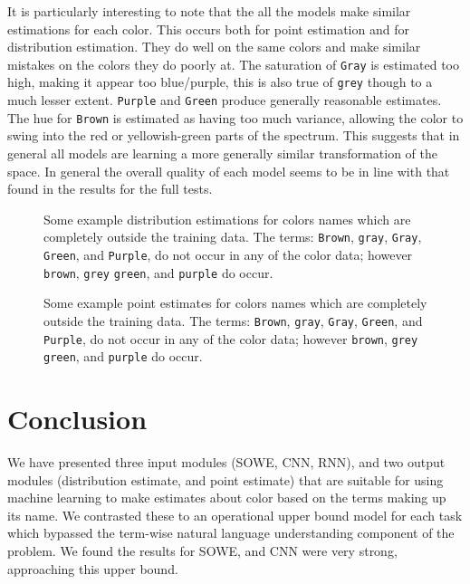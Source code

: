 \documentclass[]{book}
\newcommand{\natlang}[1]{\texttt{#1}}
\begin{document}
It is particularly interesting to note that the all the models make similar estimations for each color.
This occurs both for point estimation and for distribution estimation.
They do well on the same colors and make similar mistakes on the colors they do poorly at.
The saturation of \natlang{Gray} is estimated too high, making it appear too blue/purple, this is also true of \natlang{grey} though to a much lesser extent.
\natlang{Purple} and \natlang{Green} produce generally reasonable estimates.
The hue for \natlang{Brown} is estimated as having too much variance, allowing the color to swing into the red or yellowish-green parts of the spectrum.
This suggests that in general all models are learning a more generally similar transformation of the space.
In general the overall quality of each model seems to be in line with that found in the results for the full tests.


\begin{figure}
	\caption{Some example distribution estimations for colors names which are completely outside the training data. The terms: \natlang{Brown}, \natlang{gray}, \natlang{Gray}, \natlang{Green}, and \natlang{Purple}, do not occur in any of the color data; however \natlang{brown}, \natlang{grey} \natlang{green}, and \natlang{purple} do occur.} \label{fig:oovdist}
\end{figure}

\begin{figure}
	\caption{Some example point estimates for colors names which are completely outside the training data. The terms: \natlang{Brown}, \natlang{gray}, \natlang{Gray}, \natlang{Green}, and \natlang{Purple}, do not occur in any of the color data; however \natlang{brown}, \natlang{grey} \natlang{green}, and \natlang{purple} do occur.} \label{fig:oovpoint}
\end{figure}



\section{Conclusion}
We have presented three input modules (SOWE, CNN, RNN),
and two output modules (distribution estimate, and point estimate)
that are suitable for using machine learning to make estimates about color based on the terms making up its name.
We contrasted these to an operational upper bound model for each task which bypassed the term-wise natural language understanding component of the problem.
We found the results for SOWE, and CNN were very strong, approaching this upper bound.
\end{document}
